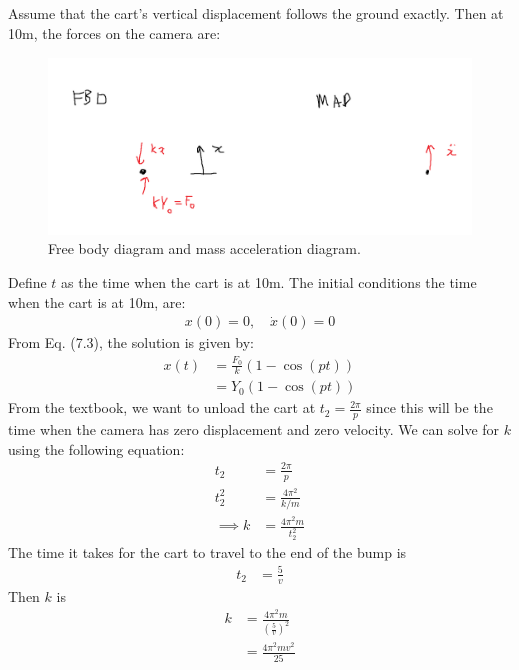 \subsection{}
Assume that the cart's vertical displacement follows the ground exactly. Then at 10m, the forces on the camera are:
\begin{figure}[H]
    \centering
    \includegraphics[width=0.8\linewidth]{Questions/Figures/Q2 FBD and MAD.png}
    \caption{Free body diagram and mass acceleration diagram.}
\end{figure}
Define $t$ as the time when the cart is at 10m. The initial conditions the time when the cart is at 10m, are:
\begin{align*}
    x(0) = 0, \quad \dot{x}(0) = 0 
\end{align*}
From Eq. (7.3), the solution is given by:
\begin{align*}
    x(t) &= \frac{F_0}{k} \left(1 - \cos(p t)\right) \\
    &= Y_0 \left(1 - \cos(p t)\right)
\end{align*}
From the textbook, we want to unload the cart at $t_2 = \frac{2 \pi}{p}$ since this will be the time when the camera has zero displacement and zero velocity. We can solve for $k$ using the following equation:
\begin{align*}
    t_2 &= \frac{2 \pi}{p} \\
    t_{2}^2 &= \frac{4 \pi^2}{k/m} \\
    \implies k &= \frac{4 \pi^2 m}{t_{2}^2}
\end{align*}
The time it takes for the cart to travel to the end of the bump is
\begin{align*}
    t_2 &= \frac{5}{v} 
\end{align*}
Then $k$ is 
\begin{align*}
    k &= \frac{4 \pi^2 m}{\left(\frac{5}{v}\right)^2} \\
    &= \boxed{\frac{4 \pi^2 m v^2}{25}}
\end{align*}

